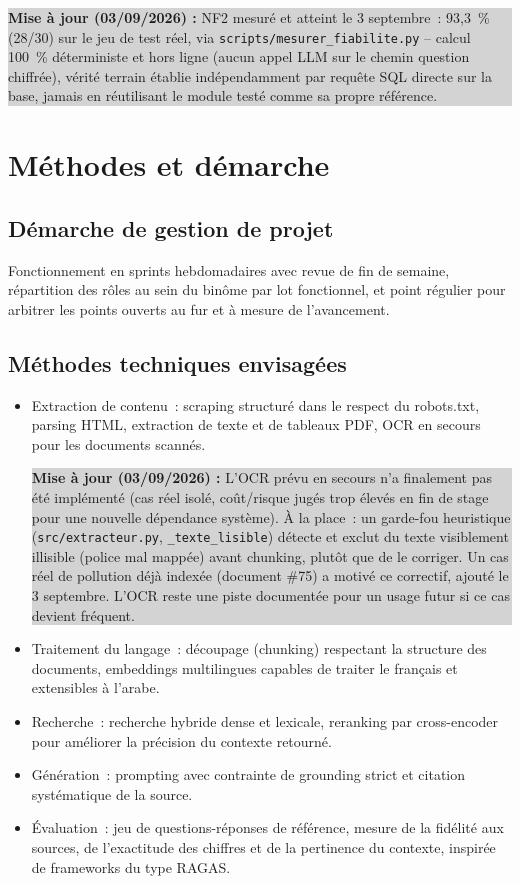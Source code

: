 \documentclass[11pt,a4paper]{article}
\newcommand{\majcadrage}[1]{%
\par\vspace{0.35cm}
\noindent\colorbox{lightgrey}{%
\begin{minipage}{\dimexpr\linewidth-2\fboxsep}
\vspace{0.15cm}
\textbf{\color{gold}Mise \`a jour (03/09/2026) :} #1
\vspace{0.15cm}
\end{minipage}%
}
\vspace{0.35cm}
}
\begin{document}
\majcadrage{NF2 mesur\'e et atteint le 3 septembre~: 93,3~\% (28/30) sur le jeu de test r\'eel, via \texttt{scripts/mesurer\_fiabilite.py} -- calcul 100~\% d\'eterministe et hors ligne (aucun appel LLM sur le chemin question chiffr\'ee), v\'erit\'e terrain \'etablie ind\'ependamment par requ\^ete SQL directe sur la base, jamais en r\'eutilisant le module test\'e comme sa propre r\'ef\'erence.}

\section{M\'ethodes et d\'emarche}
\subsection{D\'emarche de gestion de projet}
Fonctionnement en sprints hebdomadaires avec revue de fin de semaine, r\'epartition des r\^oles au sein du bin\^ome par lot fonctionnel, et point r\'egulier pour arbitrer les points ouverts au fur et \`a mesure de l'avancement.

\subsection{M\'ethodes techniques envisag\'ees}
\begin{itemize}
\item Extraction de contenu~: scraping structur\'e dans le respect du robots.txt, parsing HTML, extraction de texte et de tableaux PDF, OCR en secours pour les documents scann\'es.
\majcadrage{L'OCR pr\'evu en secours n'a finalement pas \'et\'e impl\'ement\'e (cas r\'eel isol\'e, co\^ut/risque jug\'es trop \'elev\'es en fin de stage pour une nouvelle d\'ependance syst\`eme). \`A la place~: un garde-fou heuristique (\texttt{src/extracteur.py}, \texttt{\_texte\_lisible}) d\'etecte et exclut du texte visiblement illisible (police mal mapp\'ee) avant chunking, plut\^ot que de le corriger. Un cas r\'eel de pollution d\'ej\`a index\'ee (document \#75) a motiv\'e ce correctif, ajout\'e le 3 septembre. L'OCR reste une piste document\'ee pour un usage futur si ce cas devient fr\'equent.}
\item Traitement du langage~: d\'ecoupage (chunking) respectant la structure des documents, embeddings multilingues capables de traiter le fran\c{c}ais et extensibles \`a l'arabe.
\item Recherche~: recherche hybride dense et lexicale, reranking par cross-encoder pour am\'eliorer la pr\'ecision du contexte retourn\'e.
\item G\'en\'eration~: prompting avec contrainte de grounding strict et citation syst\'ematique de la source.
\item \'Evaluation~: jeu de questions-r\'eponses de r\'ef\'erence, mesure de la fid\'elit\'e aux sources, de l'exactitude des chiffres et de la pertinence du contexte, inspir\'ee de frameworks du type RAGAS.
\end{itemize}
\end{document}
